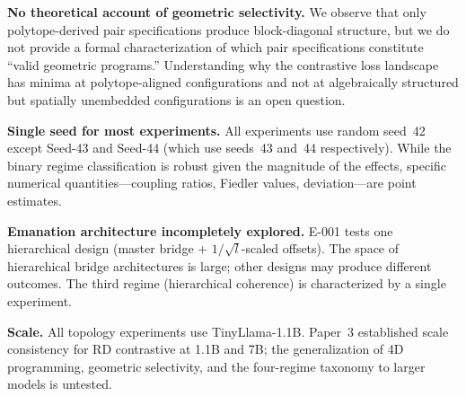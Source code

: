 \textbf{No theoretical account of geometric selectivity.} We observe
that only polytope-derived pair specifications produce block-diagonal
structure, but we do not provide a formal characterization of which
pair specifications constitute ``valid geometric programs.''
Understanding why the contrastive loss landscape has minima at
polytope-aligned configurations and not at algebraically structured
but spatially unembedded configurations is an open question.

\textbf{Single seed for most experiments.} All experiments use random
seed~42 except Seed-43 and Seed-44 (which use seeds~43 and~44
respectively). While the binary regime classification is robust given
the magnitude of the effects, specific numerical quantities---coupling
ratios, Fiedler values, deviation---are point estimates.

\textbf{Emanation architecture incompletely explored.} E-001 tests one
hierarchical design (master bridge + $1/\sqrt{l}$-scaled offsets). The
space of hierarchical bridge architectures is large; other designs may
produce different outcomes. The third regime (hierarchical coherence)
is characterized by a single experiment.

\textbf{Scale.} All topology experiments use TinyLlama-1.1B. Paper~3
established scale consistency for RD contrastive at 1.1B and 7B;
the generalization of 4D programming, geometric selectivity, and the
four-regime taxonomy to larger models is untested.
